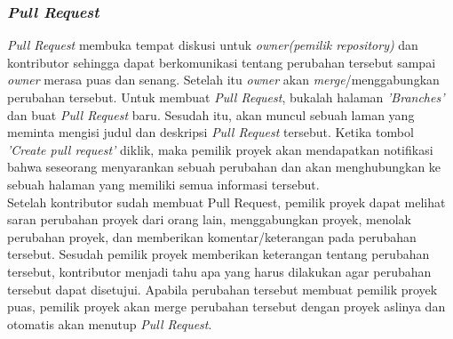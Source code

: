 \subsubsection{\textit{Pull Request}}
\textit{Pull Request} membuka tempat diskusi untuk \textit{owner(pemilik repository)} dan kontributor sehingga dapat berkomunikasi tentang perubahan tersebut sampai \textit{owner} merasa puas dan senang. Setelah itu \textit{owner} akan \textit{merge}/menggabungkan perubahan tersebut. Untuk membuat \textit{Pull Request}, bukalah halaman \textit{'Branches'} dan buat \textit{Pull Request} baru. Sesudah itu, akan muncul sebuah laman yang meminta mengisi judul dan deskripsi \textit{Pull Request} tersebut. Ketika tombol \textit{'Create pull request'} diklik,  maka pemilik proyek akan mendapatkan notifikasi bahwa seseorang menyarankan sebuah perubahan dan akan menghubungkan ke sebuah halaman yang memiliki semua informasi tersebut.\\ 

Setelah kontributor sudah membuat Pull Request, pemilik proyek dapat melihat saran  perubahan proyek dari orang lain, menggabungkan proyek, menolak perubahan proyek, dan memberikan komentar/keterangan pada perubahan tersebut. Sesudah pemilik proyek memberikan keterangan tentang perubahan tersebut, kontributor menjadi tahu apa yang harus dilakukan agar perubahan tersebut dapat disetujui. Apabila perubahan tersebut membuat pemilik proyek puas, pemilik proyek akan merge perubahan tersebut dengan proyek aslinya dan otomatis  akan menutup \textit{Pull Request}.